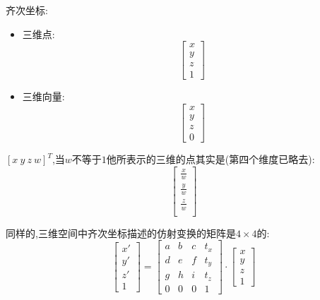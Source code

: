 \documentclass[UTF8]{ctexbook}
\begin{document}
{{{{        齐次坐标:\begin{itemize}
          \item 三维点:$$\left[\begin{array}{c}
                      x \\
                      y \\
                      z \\
                      1
                    \end{array}\right]$$
          \item 三维向量:$$\left[\begin{array}{c}
                      x \\
                      y \\
                      z \\
                      0
                    \end{array}\right]$$
        \end{itemize}

        $\left[x\ y\ z\ w\right]^T$,当$w$不等于$1$他所表示的三维的点其实是(第四个维度已略去):
        $$\left[\begin{array}{c}
              \frac{x}{w} \\
              \frac{y}{w} \\
              \frac{z}{w} \\
            \end{array}\right]$$

        同样的,三维空间中齐次坐标描述的仿射变换的矩阵是$4 \times 4$的:
        $$\left[\begin{array}{c}
              x\prime \\
              y\prime \\
              z\prime \\
              1
            \end{array}\right]
          =
          \left[\begin{matrix}
              a & b & c & t_x \\
              d & e & f & t_y \\
              g & h & i & t_z \\
              0 & 0 & 0 & 1
            \end{matrix}\right]
          \cdot
          \left[\begin{array}{c}
              x \\
              y \\
              z \\
              1
            \end{array}\right]$$

}}}}
\end{document}
